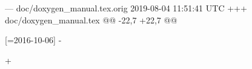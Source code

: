 --- doc/doxygen_manual.tex.orig	2019-08-04 11:51:41 UTC
+++ doc/doxygen_manual.tex
@@ -22,7 +22,7 @@
 \usepackage{array}[=2016-10-06]
 \fi
-\usepackage[a4paper,left=2.5cm,right=2.5cm,top=2.5cm,bottom=2.5cm]{geometry}
+\usepackage[left=2.5cm,right=2.5cm,top=2.5cm,bottom=2.5cm]{geometry}
 \usepackage{makeidx}
 \usepackage{natbib}
 \usepackage{graphicx}
